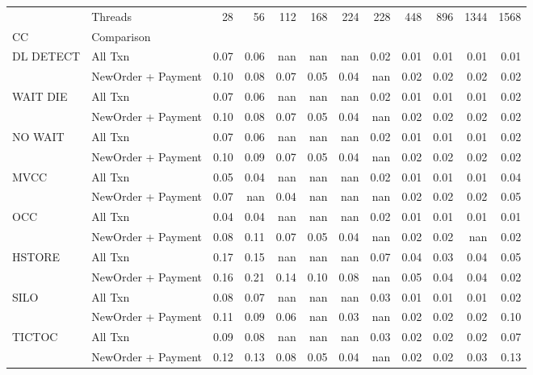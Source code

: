 \begin{tabular}{llrrrrrrrrrr}
\toprule
       & Threads &  28   &  56   &  112  &  168  &  224  &  228  &  448  &  896  &  1344 &  1568 \\
CC & Comparison &       &       &       &       &       &       &       &       &       &       \\
\midrule
DL DETECT & All Txn &  0.07 &  0.06 &   nan &   nan &   nan &  0.02 &  0.01 &  0.01 &  0.01 &  0.01 \\
       & NewOrder + Payment &  0.10 &  0.08 &  0.07 &  0.05 &  0.04 &   nan &  0.02 &  0.02 &  0.02 &  0.02 \\
WAIT DIE & All Txn &  0.07 &  0.06 &   nan &   nan &   nan &  0.02 &  0.01 &  0.01 &  0.01 &  0.02 \\
       & NewOrder + Payment &  0.10 &  0.08 &  0.07 &  0.05 &  0.04 &   nan &  0.02 &  0.02 &  0.02 &  0.02 \\
NO WAIT & All Txn &  0.07 &  0.06 &   nan &   nan &   nan &  0.02 &  0.01 &  0.01 &  0.01 &  0.02 \\
       & NewOrder + Payment &  0.10 &  0.09 &  0.07 &  0.05 &  0.04 &   nan &  0.02 &  0.02 &  0.02 &  0.02 \\
MVCC & All Txn &  0.05 &  0.04 &   nan &   nan &   nan &  0.02 &  0.01 &  0.01 &  0.01 &  0.04 \\
       & NewOrder + Payment &  0.07 &   nan &  0.04 &   nan &   nan &   nan &  0.02 &  0.02 &  0.02 &  0.05 \\
OCC & All Txn &  0.04 &  0.04 &   nan &   nan &   nan &  0.02 &  0.01 &  0.01 &  0.01 &  0.01 \\
       & NewOrder + Payment &  0.08 &  0.11 &  0.07 &  0.05 &  0.04 &   nan &  0.02 &  0.02 &   nan &  0.02 \\
HSTORE & All Txn &  0.17 &  0.15 &   nan &   nan &   nan &  0.07 &  0.04 &  0.03 &  0.04 &  0.05 \\
       & NewOrder + Payment &  0.16 &  0.21 &  0.14 &  0.10 &  0.08 &   nan &  0.05 &  0.04 &  0.04 &  0.02 \\
SILO & All Txn &  0.08 &  0.07 &   nan &   nan &   nan &  0.03 &  0.01 &  0.01 &  0.01 &  0.02 \\
       & NewOrder + Payment &  0.11 &  0.09 &  0.06 &   nan &  0.03 &   nan &  0.02 &  0.02 &  0.02 &  0.10 \\
TICTOC & All Txn &  0.09 &  0.08 &   nan &   nan &   nan &  0.03 &  0.02 &  0.02 &  0.02 &  0.07 \\
       & NewOrder + Payment &  0.12 &  0.13 &  0.08 &  0.05 &  0.04 &   nan &  0.02 &  0.02 &  0.03 &  0.13 \\
\bottomrule
\end{tabular}
